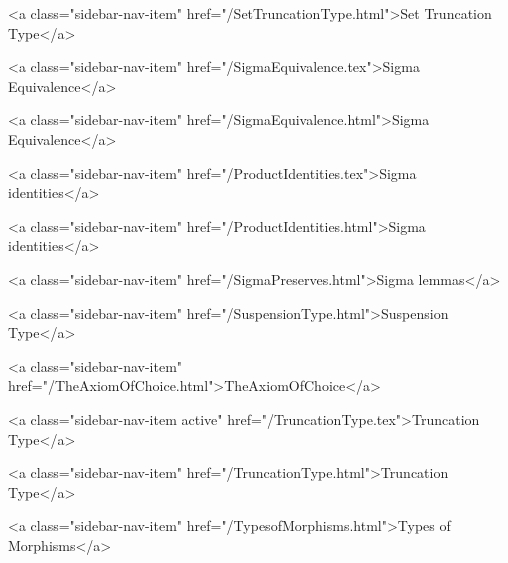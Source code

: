       
    
      
        
          <a class="sidebar-nav-item" href="/SetTruncationType.html">Set Truncation Type</a>
        
      
    
      
        
          <a class="sidebar-nav-item" href="/SigmaEquivalence.tex">Sigma Equivalence</a>
        
      
    
      
        
          <a class="sidebar-nav-item" href="/SigmaEquivalence.html">Sigma Equivalence</a>
        
      
    
      
        
          <a class="sidebar-nav-item" href="/ProductIdentities.tex">Sigma identities</a>
        
      
    
      
        
          <a class="sidebar-nav-item" href="/ProductIdentities.html">Sigma identities</a>
        
      
    
      
        
          <a class="sidebar-nav-item" href="/SigmaPreserves.html">Sigma lemmas</a>
        
      
    
      
        
          <a class="sidebar-nav-item" href="/SuspensionType.html">Suspension Type</a>
        
      
    
      
        
          <a class="sidebar-nav-item" href="/TheAxiomOfChoice.html">TheAxiomOfChoice</a>
        
      
    
      
        
          <a class="sidebar-nav-item active" href="/TruncationType.tex">Truncation Type</a>
        
      
    
      
        
          <a class="sidebar-nav-item" href="/TruncationType.html">Truncation Type</a>
        
      
    
      
        
          <a class="sidebar-nav-item" href="/TypesofMorphisms.html">Types of Morphisms</a>
        
